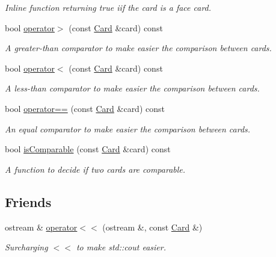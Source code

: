 \begin{DoxyCompactItemize}
\begin{DoxyCompactList}\small\item\em \-Inline function returning true iif the card is a face card. \end{DoxyCompactList}\item 
bool \hyperlink{classCard_a50bd8a1a5d5bdfce5727718844f87ce8}{operator$>$} (const \hyperlink{classCard}{\-Card} \&card) const 
\begin{DoxyCompactList}\small\item\em \-A greater-\/than comparator to make easier the comparison between cards. \end{DoxyCompactList}\item 
bool \hyperlink{classCard_a0210e809d9ec749824716ec1f5ebbf8a}{operator$<$} (const \hyperlink{classCard}{\-Card} \&card) const 
\begin{DoxyCompactList}\small\item\em \-A less-\/than comparator to make easier the comparison between cards. \end{DoxyCompactList}\item 
bool \hyperlink{classCard_a54a1553ca40e32768ee09465447b8090}{operator==} (const \hyperlink{classCard}{\-Card} \&card) const 
\begin{DoxyCompactList}\small\item\em \-An equal comparator to make easier the comparison between cards. \end{DoxyCompactList}\item 
bool \hyperlink{classCard_a2c531d32de5e76e758254b9d03689ae5}{is\-Comparable} (const \hyperlink{classCard}{\-Card} \&card) const 
\begin{DoxyCompactList}\small\item\em \-A function to decide if two cards are comparable. \end{DoxyCompactList}\end{DoxyCompactItemize}
\subsection*{\-Friends}
\begin{DoxyCompactItemize}
\item 
\hypertarget{classCard_a19eb35e24a8f6368e34575698fca9008}{ostream \& \hyperlink{classCard_a19eb35e24a8f6368e34575698fca9008}{operator$<$$<$} (ostream \&, const \hyperlink{classCard}{\-Card} \&)}\label{classCard_a19eb35e24a8f6368e34575698fca9008}

\begin{DoxyCompactList}\small\item\em \-Surcharging $<$$<$ to make std\-::cout easier. \end{DoxyCompactList}\end{DoxyCompactItemize}


